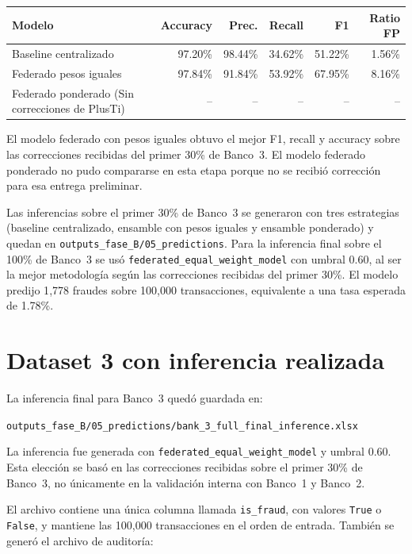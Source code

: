 \documentclass[10pt,a4paper]{article}
\begin{document}
\begin{center}
\scriptsize
\begin{tabular}{p{}rrrrr}
\toprule
\textbf{Modelo} & \textbf{Accuracy} & \textbf{Prec.} & \textbf{Recall} & \textbf{F1} & \textbf{Ratio FP} \\
\midrule
Baseline centralizado & 97.20\% & 98.44\% & 34.62\% & 51.22\% & 1.56\% \\
Federado pesos iguales & 97.84\% & 91.84\% & 53.92\% & 67.95\% & 8.16\% \\
Federado ponderado (Sin correcciones de PlusTi) & -- & -- & -- & -- & -- \\
\bottomrule
\end{tabular}
\end{center}

El modelo federado con pesos iguales obtuvo el mejor F1, recall y accuracy sobre las
correcciones recibidas del primer 30\% de Banco~3. El modelo federado ponderado no pudo
compararse en esta etapa porque no se recibió corrección para esa entrega preliminar.

Las inferencias sobre el primer 30\% de Banco~3 se generaron con tres
estrategias (baseline centralizado, ensamble con pesos iguales y ensamble ponderado)
y quedan en \nolinkurl{outputs_fase_B/05_predictions}. Para la inferencia final sobre
el 100\% de Banco~3 se usó \texttt{federated\_equal\_weight\_model} con umbral 0.60,
al ser la mejor metodología según las correcciones recibidas del primer 30\%.
El modelo predijo 1{,}778 fraudes sobre 100{,}000 transacciones, equivalente a una
tasa esperada de 1.78\%.

\section{Dataset 3 con inferencia realizada}

La inferencia final para Banco~3 quedó guardada en:

\begin{center}
\nolinkurl{outputs_fase_B/05_predictions/bank_3_full_final_inference.xlsx}
\end{center}

La inferencia fue generada con \texttt{federated\_equal\_weight\_model} y umbral 0.60.
Esta elección se basó en las correcciones recibidas sobre el primer 30\% de Banco~3,
no únicamente en la validación interna con Banco~1 y Banco~2.

El archivo contiene una única columna llamada \texttt{is\_fraud}, con valores
\texttt{True} o \texttt{False}, y mantiene las 100{,}000 transacciones en el orden de
entrada. También se generó el archivo de auditoría:
\end{document}
